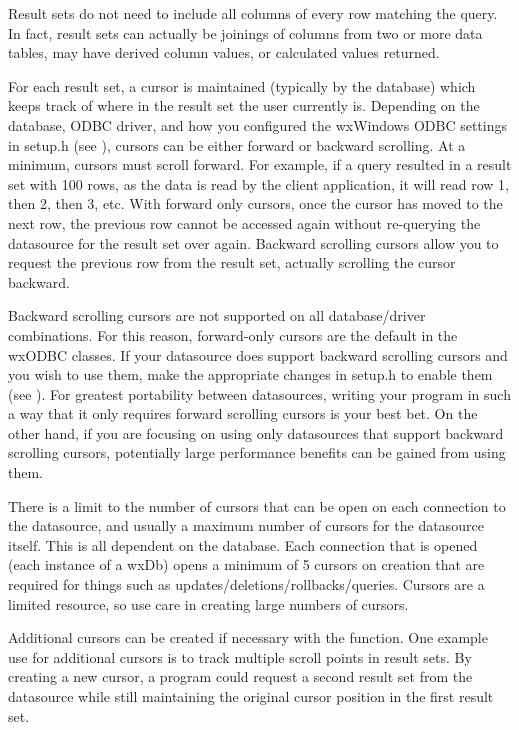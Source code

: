 Result sets do not need to include all columns of every row matching the 
query. In fact, result sets can actually be joinings of columns from two 
or more data tables, may have derived column values, or calculated values 
returned.

For each result set, a cursor is maintained (typically by the database) 
which keeps track of where in the result set the user currently is. 
Depending on the database, ODBC driver, and how you configured the 
wxWindows ODBC settings in setup.h (see ), cursors can be 
either forward or backward scrolling. At a minimum, cursors must scroll 
forward. For example, if a query resulted in a result set with 100 rows, 
as the data is read by the client application, it will read row 1, then 2, 
then 3, etc. With forward only cursors, once the cursor has moved to 
the next row, the previous row cannot be accessed again without re-querying 
the datasource for the result set over again. Backward scrolling cursors 
allow you to request the previous row from the result set, actually 
scrolling the cursor backward.

Backward scrolling cursors are not supported on all database/driver 
combinations. For this reason, forward-only cursors are the default in 
the wxODBC classes. If your datasource does support backward scrolling 
cursors and you wish to use them, make the appropriate changes in setup.h 
to enable them (see ). For greatest portability between 
datasources, writing your program in such a way that it only requires 
forward scrolling cursors is your best bet. On the other hand, if you are 
focusing on using only datasources that support backward scrolling cursors, 
potentially large performance benefits can be gained from using them.

There is a limit to the number of cursors that can be open on each connection 
to the datasource, and usually a maximum number of cursors for the datasource 
itself. This is all dependent on the database. Each connection that is 
opened (each instance of a wxDb) opens a minimum of 5 cursors on creation 
that are required for things such as updates/deletions/rollbacks/queries. 
Cursors are a limited resource, so use care in creating large numbers of 
cursors.

Additional cursors can be created if necessary with the 
 function. One example 
use for additional cursors is to track multiple scroll points in result 
sets. By creating a new cursor, a program could request a second result set 
from the datasource while still maintaining the original cursor position in 
the first result set.

